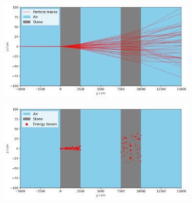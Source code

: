 \begin{frame}{}
\begin{minipage}[t][1cm][t]{\textwidth}
\begin{columns}[onlytextwidth]
\begin{column}{0.5\textwidth}
\begin{figure}
                \centering
                \includegraphics[width=0.85\textwidth]{plots/tracks.png}
            \end{figure}
            \vspace{-3mm}
            \begin{figure}
                \centering
                \includegraphics[width=0.85\textwidth]{plots/losses.png}
            \end{figure}
        \end{column}
    \end{columns}

  \end{minipage}
\end{frame}



